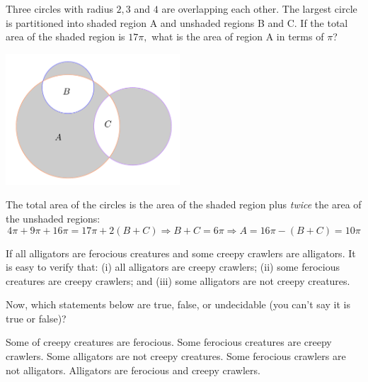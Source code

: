 \documentclass{article}
\begin{document}
\newpage

\begin{exercise*}

    Three circles with radius $2, 3$ and $4$ are overlapping each other.
    The largest circle is partitioned into shaded region A and unshaded regions B and C.
    If the total area of the shaded region is $17\pi,$ what is the area of region A in terms of $\pi$?
\end{exercise*}

\begin{center}
    \includegraphics[width=6.5cm]{./svg/pdf/pi-2023-01-02.pdf}
\end{center}

\begin{soln}
    The total area of the circles is the area of the shaded region plus \textit{twice} the area of the unshaded regions:
    \[
        4\pi + 9\pi + 16\pi = 17\pi + 2(B+C) \Rightarrow B+C = 6\pi \Rightarrow A = 16\pi - (B+C) = \boxed{10\pi}
    \]
\end{soln}

\newpage

\begin{example*}

    If all alligators are ferocious creatures and some creepy crawlers are alligators. It is easy to verify that:
    (i) all alligators are creepy crawlers; (ii) some ferocious creatures are creepy crawlers;
    and (iii) some alligators are not creepy creatures.
    
	Now, which statements below are true, false, or undecidable (you can't say it is true or false)?
    \begin{enumerate}[topsep=0pt, partopsep=0pt, itemsep=0pt]
        \ii[S1.] Some of creepy creatures are ferocious.
        \ii[S2.] Some ferocious creatures are creepy crawlers.
        \ii[S3.] Some alligators are not creepy creatures.
        \ii[S4.] Some ferocious crawlers are not alligators.
        \ii[S5.] Alligators are ferocious and creepy crawlers.
    \end{enumerate}
\end{example*}
\end{document}
